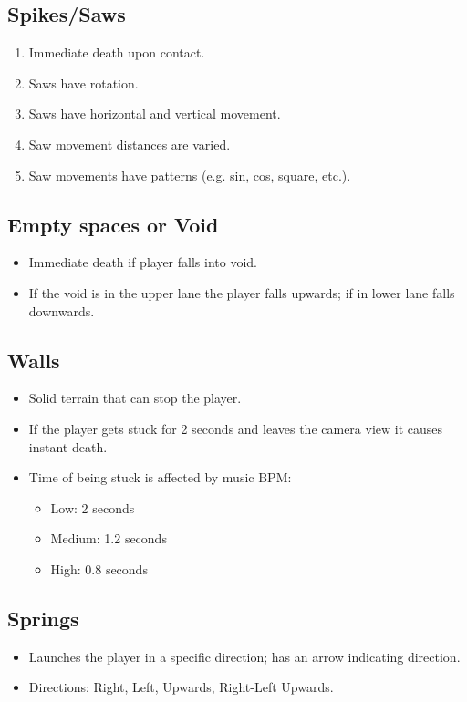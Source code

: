 \documentclass[11pt,a4paper]{report}
\begin{document}
\subsection{Spikes/Saws}
\begin{enumerate}
  \item Immediate death upon contact.
  \item Saws have rotation.
  \item Saws have horizontal and vertical movement.
  \item Saw movement distances are varied.
  \item Saw movements have patterns (e.g. sin, cos, square, etc.).
\end{enumerate}

\subsection{Empty spaces or Void}
\begin{itemize}
  \item Immediate death if player falls into void.
  \item If the void is in the upper lane the player falls upwards; if in lower lane falls downwards.
\end{itemize}

\subsection{Walls}
\begin{itemize}
  \item Solid terrain that can stop the player.
  \item If the player gets stuck for 2 seconds and leaves the camera view it causes instant death.
  \item Time of being stuck is affected by music BPM:
  \begin{itemize}
    \item Low: 2 seconds
    \item Medium: 1.2 seconds
    \item High: 0.8 seconds
  \end{itemize}
\end{itemize}

\subsection{Springs}
\begin{itemize}
  \item Launches the player in a specific direction; has an arrow indicating direction.
  \item Directions: Right, Left, Upwards, Right-Left Upwards.
\end{itemize}
\end{document}
